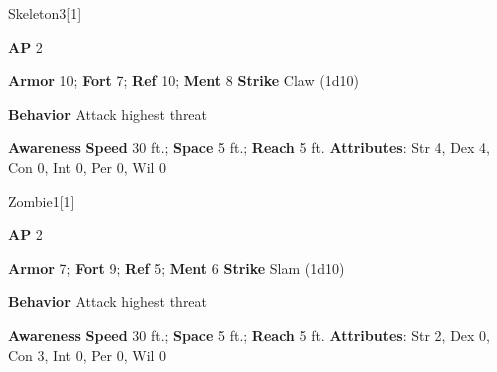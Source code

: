 \begin{monsection}[Warrior]{Skeleton}{3}[1]
\vspace{-1em}\vspace{-1em}
\begin{spellcontent}
\begin{spelltargetinginfo}
{\textbf{AP} 2}

\pari \textbf{Armor} 10;
\textbf{Fort} 7;
\textbf{Ref} 10;
\textbf{Ment} 8
\pari \textbf{Strike} Claw  (1d10)



\pari \textbf{Behavior} Attack highest threat
\end{spelltargetinginfo}
\end{spellcontent}

\begin{monsterfooter}
\pari \textbf{Awareness} 
\pari \textbf{Speed} 30 ft.;
\textbf{Space} 5 ft.;
\textbf{Reach} 5 ft.
\pari \textbf{Attributes}:
Str 4,
Dex 4,
Con 0,
Int 0,
Per 0,
Wil 0
\end{monsterfooter}
\end{monsection}





\begin{monsection}{Zombie}{1}[1]
\vspace{-1em}\vspace{-1em}
\begin{spellcontent}
\begin{spelltargetinginfo}
{\textbf{AP} 2}

\pari \textbf{Armor} 7;
\textbf{Fort} 9;
\textbf{Ref} 5;
\textbf{Ment} 6
\pari \textbf{Strike} Slam  (1d10)



\pari \textbf{Behavior} Attack highest threat
\end{spelltargetinginfo}
\end{spellcontent}

\begin{monsterfooter}
\pari \textbf{Awareness} 
\pari \textbf{Speed} 30 ft.;
\textbf{Space} 5 ft.;
\textbf{Reach} 5 ft.
\pari \textbf{Attributes}:
Str 2,
Dex 0,
Con 3,
Int 0,
Per 0,
Wil 0
\end{monsterfooter}
\end{monsection}



